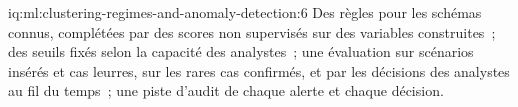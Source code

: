\begin{solution}{iq:ml:clustering-regimes-and-anomaly-detection:6}
Des règles pour les schémas connus, complétées par des scores non supervisés sur des variables construites~; des seuils fixés selon la capacité des analystes~; une évaluation sur
scénarios insérés et cas leurres, sur les rares cas confirmés, et par les décisions des analystes au fil du temps~; une piste d'audit de chaque
alerte et chaque décision.
\end{solution}
